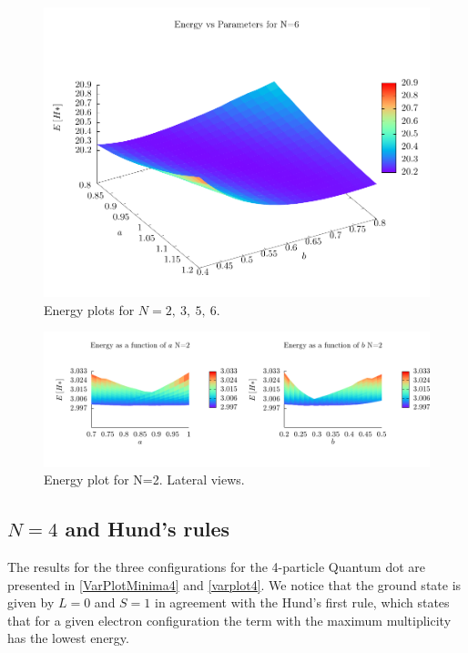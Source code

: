 \begin{figure}[h]
\begin{minipage}{0.5\textwidth}
    \includegraphics[width=\textwidth]{Graphics/surf6.pdf}
  \end{minipage}
  \begin{center}
    \caption{Energy plots for $N=2,\>3,\>5,\>6$.}
    \label{varplot}
  \end{center}
\end{figure}

\begin{figure}[h]
  \centering
  \includegraphics[width=\textwidth]{Graphics/surf2ab.pdf}
  \caption{Energy plot for N=2. Lateral views.}
  \label{varplot2ab}
\end{figure}

\subsection{$N=4$ and Hund's rules}

The results for the three configurations for the 4-particle Quantum dot are presented in \autoref{VarPlotMinima4} and \autoref{varplot4}.
We notice that the ground state is given by $L=0$ and $S=1$ in agreement with the Hund's first rule, which states that for a given electron configuration the term with the maximum multiplicity has the lowest energy.

